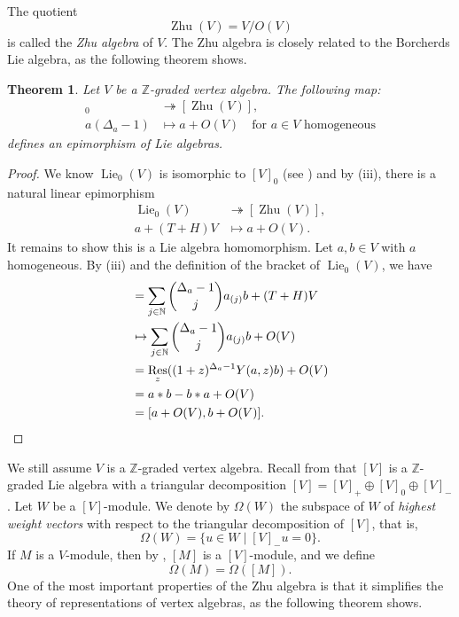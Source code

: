 \documentclass[a4paper, 12pt, reqno]{amsart}
\newtheorem{theorem}{Theorem}[section]
\theoremstyle{remark}
\numberwithin{equation}{subsection}
\DeclareMathOperator{\Res}{Res}
\DeclareMathOperator{\Lie}{Lie}
\DeclareMathOperator{\Zhu}{Zhu}
\begin{document}
The quotient
\begin{equation*}
  \Zhu(V) = V/O(V)
\end{equation*}
is called the \emph{Zhu algebra} of $V$.
The Zhu algebra is closely related to the Borcherds Lie algebra, as the following theorem shows.

\begin{theorem}
  \label{thr:35}
  Let $V$ be a $\mathbb{Z}$-graded vertex algebra.
  The following map:
  \begin{align*}
    [V]_0 &\twoheadrightarrow [\Zhu(V)], \\
    a(\Delta_a - 1) &\mapsto a + O(V) \quad \text{for }a \in V\text{ homogeneous}
  \end{align*}
  defines an epimorphism of Lie algebras.
\end{theorem}

\begin{proof}
  We know $\Lie_0(V)$ is isomorphic to $[V]_0$ (see ) and by (iii), there is a natural linear epimorphism
  \begin{align*}
    \Lie_0(V) &\twoheadrightarrow [\Zhu(V)], \\
    a + (T + H)V &\mapsto a + O(V).
  \end{align*}
  It remains to show this is a Lie algebra homomorphism.
  Let $a, b \in V$ with $a$ homogeneous.
  By (iii) and the definition of the bracket of $\Lie_0(V)$, we have
  \begin{align*}
    [a + (T + H)V, b + (T + H)V] &= \sum_{j \in \mathbb{N}}\binom{\Delta_a - 1}{j}a_{(j)}b + (T + H)V \\
    &\mapsto \sum_{j \in \mathbb{N}}\binom{\Delta_a - 1}{j}a_{(j)}b + O(V) \\
    &= \Res_z((1 + z)^{\Delta_a - 1}Y(a, z)b) + O(V) \\
    &= a*b - b*a + O(V) \\
    &= [a + O(V), b + O(V)]. \qedhere
  \end{align*}
\end{proof}

We still assume $V$ is a $\mathbb{Z}$-graded vertex algebra.
Recall from  that $[V]$ is a $\mathbb{Z}$-graded Lie algebra with a triangular decomposition $[V] = [V]_+ \oplus [V]_0 \oplus [V]_-$.
Let $W$ be a $[V]$-module.
We denote by $\Omega(W)$ the subspace of $W$ of \emph{highest weight vectors} with respect to the triangular decomposition of $[V]$, that is,
\begin{equation*}
  \Omega(W) = \{u \in W \mid [V]_-u = 0\}.
\end{equation*}
If $M$ is a $V$-module, then by , $[M]$ is a $[V]$-module, and we define
\begin{equation*}
  \Omega(M) = \Omega([M]).
\end{equation*}
One of the most important properties of the Zhu algebra is that it simplifies the theory of representations of vertex algebras, as the following theorem shows.
\end{document}
